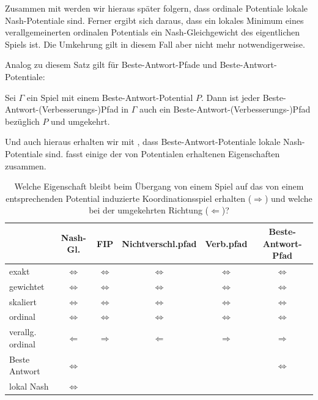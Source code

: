 Zusammen mit  werden wir hieraus später folgern, dass ordinale Potentiale lokale Nash-Potentiale sind. Ferner ergibt sich daraus, dass ein lokales Minimum eines verallgemeinerten ordinalen Potentials ein Nash-Gleichgewicht des eigentlichen Spiels ist. Die Umkehrung gilt in diesem Fall aber nicht mehr notwendigerweise.

Analog zu diesem Satz gilt für Beste-Antwort-Pfade und Beste-Antwort-Potentiale:

\begin{satz}\label{prop:BAPotBAPad}
	Sei $\Gamma$ ein Spiel mit einem Beste-Antwort-Potential $P$. Dann ist jeder Beste-Antwort-(Verbesserungs-)Pfad in $\Gamma$ auch ein Beste-Antwort-(Verbesserungs-)Pfad bezüglich $P$ und umgekehrt.
\end{satz}

Und auch hieraus erhalten wir mit , dass Beste-Antwort-Potentiale lokale Nash-Potentiale sind.  fasst einige der von Potentialen erhaltenen Eigenschaften zusammen.

\begin{table}[h]\centering
	\begin{tabular}{l|ccccc}
						& Nash-Gl. 			& FIP 					& Nichtverschl.pfad 			& Verb.pfad 		& Beste-Antwort-Pfad \\\hline
		exakt			& $\Leftrightarrow$	& $\Leftrightarrow$ 	& $\Leftrightarrow$				& $\Leftrightarrow$	& $\Leftrightarrow$ \\
		gewichtet		& $\Leftrightarrow$	& $\Leftrightarrow$ 	& $\Leftrightarrow$				& $\Leftrightarrow$	& $\Leftrightarrow$ \\		
		skaliert		& $\Leftrightarrow$ & $\Leftrightarrow$ 	& $\Leftrightarrow$				& $\Leftrightarrow$	& $\Leftrightarrow$ \\
		ordinal			& $\Leftrightarrow$	& $\Leftrightarrow$ 	& $\Leftrightarrow$				& $\Leftrightarrow$	& $\Leftrightarrow$ \\
		verallg. ordinal& $\Leftarrow$		& $\Rightarrow$		 	& $\Leftarrow$					& $\Rightarrow$		& $\Rightarrow$ 	\\
		Beste Antwort	& $\Leftrightarrow$	& 					 	& 								& 					& $\Leftrightarrow$ \\
		lokal Nash		& $\Leftrightarrow$	& 					 	& 								& 					& 					
	\end{tabular}	
	\caption{Welche Eigenschaft bleibt beim Übergang von einem Spiel auf das von einem entsprechenden Potential induzierte Koordinationsspiel erhalten ($\Rightarrow$) und welche bei der umgekehrten Richtung ($\Leftarrow$)?\\}\label{tab:PotErhalten}
\end{table}

